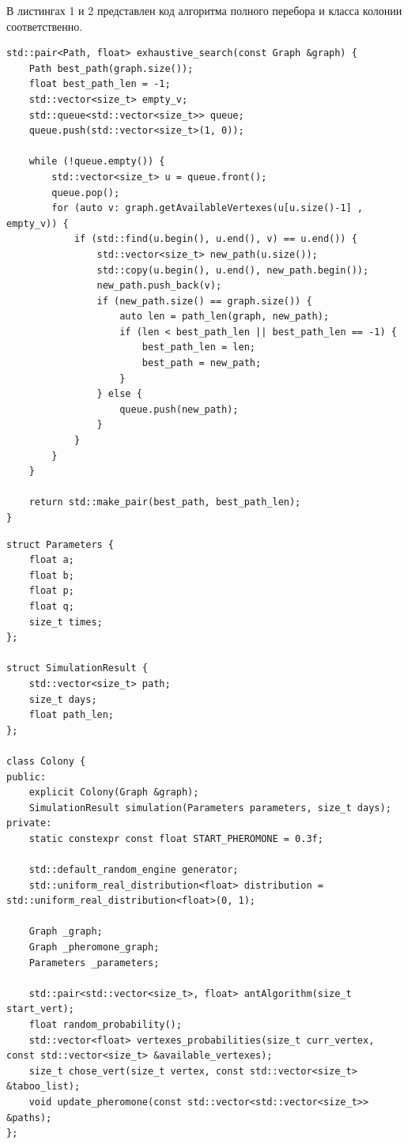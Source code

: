 \documentclass[a4paper,12pt]{article}
\begin{document}
 В листингах 1 и 2 представлен код алгоритма полного перебора и класса колонии соответственно.
\begin{lstlisting}[frame=single,caption=Алгоритм полного перебора, breaklines]
std::pair<Path, float> exhaustive_search(const Graph &graph) {
    Path best_path(graph.size());
    float best_path_len = -1;
    std::vector<size_t> empty_v;
    std::queue<std::vector<size_t>> queue;
    queue.push(std::vector<size_t>(1, 0));

    while (!queue.empty()) {
        std::vector<size_t> u = queue.front();
        queue.pop();
        for (auto v: graph.getAvailableVertexes(u[u.size()-1] , empty_v)) {
            if (std::find(u.begin(), u.end(), v) == u.end()) {
                std::vector<size_t> new_path(u.size());
                std::copy(u.begin(), u.end(), new_path.begin());
                new_path.push_back(v);
                if (new_path.size() == graph.size()) {
                    auto len = path_len(graph, new_path);
                    if (len < best_path_len || best_path_len == -1) {
                        best_path_len = len;
                        best_path = new_path;
                    }
                } else {
                    queue.push(new_path);
                }
            }
        }
    }

    return std::make_pair(best_path, best_path_len);
}
\end{lstlisting}
\newpage
\begin{lstlisting}[frame=single,caption=Класс муравьиной колонии, breaklines]
struct Parameters {
    float a;
    float b;
    float p;
    float q;
    size_t times;
};

struct SimulationResult {
    std::vector<size_t> path;
    size_t days;
    float path_len;
};

class Colony {
public:
    explicit Colony(Graph &graph);
    SimulationResult simulation(Parameters parameters, size_t days);
private:
    static constexpr const float START_PHEROMONE = 0.3f;

    std::default_random_engine generator;
    std::uniform_real_distribution<float> distribution = std::uniform_real_distribution<float>(0, 1);

    Graph _graph;
    Graph _pheromone_graph;
    Parameters _parameters;

    std::pair<std::vector<size_t>, float> antAlgorithm(size_t start_vert);
    float random_probability();
    std::vector<float> vertexes_probabilities(size_t curr_vertex, const std::vector<size_t> &available_vertexes);
    size_t chose_vert(size_t vertex, const std::vector<size_t> &taboo_list);
    void update_pheromone(const std::vector<std::vector<size_t>> &paths);
};
\end{lstlisting}
    \newpage
\end{document}
